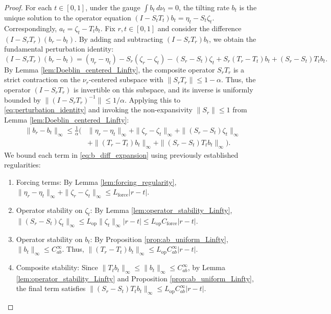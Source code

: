\documentclass[11pt]{article}
\theoremstyle{definition}
\numberwithin{equation}{section}%
\begin{document}
{\begin{proof}
For each $t \in [0,1]$, under the gauge $\int b_t \, d\nu_t = 0$, the tilting rate $b_t$ is the unique solution to the operator equation $(I - S_t T_t) b_t = \eta_t - S_t \zeta_t$. Correspondingly, $a_t = \zeta_t - T_t b_t$. Fix $r, t \in [0,1]$ and consider the difference $(I - S_r T_r)(b_r - b_t)$. By adding and subtracting $(I - S_r T_r)b_t$, we obtain the fundamental perturbation identity:
\begin{equation}
\label{eq:perturbation_identity}
(I - S_r T_r)(b_r - b_t) = (\eta_r - \eta_t) - S_r(\zeta_r - \zeta_t) - (S_r - S_t) \zeta_t + S_r(T_r - T_t) b_t + (S_r - S_t) T_t b_t.
\end{equation}
By Lemma \ref{lem:Doeblin_centered_Linfty}, the composite operator $S_r T_r$ is a strict contraction on the $\nu_r$-centered subspace with $\|S_r T_r\| \le 1 - \alpha$. Thus, the operator $(I - S_r T_r)$ is invertible on this subspace, and its inverse is uniformly bounded by $\|(I - S_r T_r)^{-1}\| \le 1/\alpha$. Applying this to \eqref{eq:perturbation_identity} and invoking the non-expansivity $\|S_r\| \le 1$ from Lemma \ref{lem:Doeblin_centered_Linfty}:
\begin{align}
\label{eq:b_diff_expansion}
\|b_r - b_t\|_\infty \le \frac{1}{\alpha} \Big( & \|\eta_r - \eta_t\|_\infty + \|\zeta_r - \zeta_t\|_\infty + \|(S_r - S_t) \zeta_t\|_\infty \nonumber \\
& + \|(T_r - T_t) b_t\|_\infty + \|(S_r - S_t) T_t b_t\|_\infty \Big).
\end{align}
We bound each term in \eqref{eq:b_diff_expansion} using previously established regularities:
\begin{enumerate}[label=(\roman*)]
    \item Forcing terms: By Lemma \ref{lem:forcing_regularity}, $\|\eta_r - \eta_t\|_\infty + \|\zeta_r - \zeta_t\|_\infty \le L_{\mathrm{force}} |r - t|$.
    \item Operator stability on $\zeta_t$: By Lemma \ref{lem:operator_stability_Linfty}, $\|(S_r - S_t) \zeta_t\|_\infty \le L_{\mathrm{op}} \|\zeta_t\|_\infty |r - t| \le L_{\mathrm{op}} C_{\mathrm{force}} |r - t|$.
    \item Operator stability on $b_t$: By Proposition \ref{prop:ab_uniform_Linfty}, $\|b_t\|_\infty \le C_{ab}^\infty$. Thus, $\|(T_r - T_t) b_t\|_\infty \le L_{\mathrm{op}} C_{ab}^\infty |r - t|$.
    \item Composite stability: Since $\|T_t b_t\|_\infty \le \|b_t\|_\infty \le C_{ab}^\infty$, by Lemma \ref{lem:operator_stability_Linfty} and Proposition \ref{prop:ab_uniform_Linfty}, the final term satisfies $\|(S_r - S_t) T_t b_t\|_\infty \le L_{\mathrm{op}} C_{ab}^\infty |r - t|$.

\end{enumerate}
\end{proof}}
\end{document}
